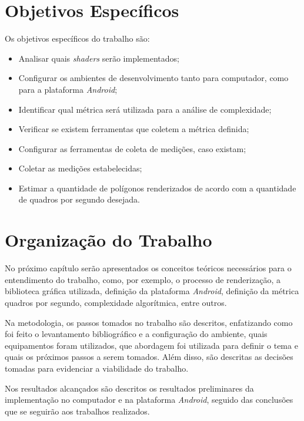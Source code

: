 \section{Objetivos Específicos}

Os objetivos específicos do trabalho são:

\begin{itemize}
  \item Analisar quais \textit{shaders} serão implementados;
  \item Configurar os ambientes de desenvolvimento tanto para computador, como para a plataforma \textit{Android};
  \item Identificar qual métrica será utilizada para a análise de complexidade;
\item Verificar se existem ferramentas que coletem a métrica definida;
\item Configurar as ferramentas de coleta de medições, caso existam; 
\item Coletar as medições estabelecidas;
\item  Estimar a quantidade de polígonos renderizados de acordo com a quantidade de quadros por segundo desejada.
\end{itemize}

\section{Organização do Trabalho}

	No próximo capítulo serão apresentados os conceitos teóricos necessários para o entendimento do trabalho, como, por exemplo, o processo de renderização, a biblioteca gráfica utilizada,  definição da plataforma \textit{Android}, definição da métrica quadros por segundo, complexidade algorítmica, entre outros. 

	Na metodologia, os passos tomados no trabalho são descritos, enfatizando como foi feito o levantamento bibliográfico e a configuração do ambiente, quais equipamentos foram utilizados, que abordagem foi utilizada para definir o tema e quais os próximos passos a serem tomados. Além disso, são descritas as decisões tomadas para evidenciar a viabilidade do trabalho.

	Nos resultados alcançados são descritos os resultados preliminares da implementação no computador e na plataforma \textit{Android}, seguido das conclusões que se seguirão aos trabalhos realizados.   



